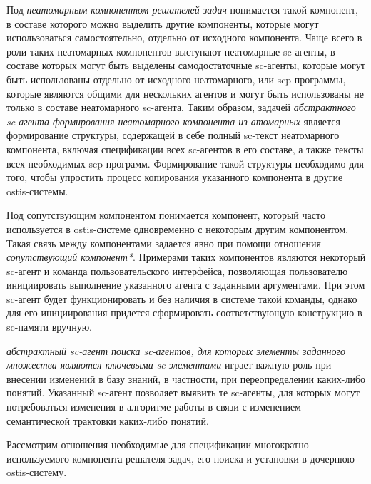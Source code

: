 Под \textit{неатомарным компонентом решателей задач} понимается такой компонент, в составе которого можно выделить другие компоненты, которые могут использоваться самостоятельно, отдельно от исходного компонента. Чаще всего в роли таких неатомарных компонентов выступают неатомарные sc-агенты, в составе которых могут быть выделены самодостаточные sc-агенты, которые могут быть использованы отдельно от исходного неатомарного, или scp-программы, которые являются общими для нескольких агентов и могут быть использованы не только в составе неатомарного sc-агента. Таким образом, задачей \textit{абстрактного sc-агента формирования неатомарного компонента из атомарных} является формирование структуры, содержащей в себе полный sc-текст неатомарного компонента, включая спецификации всех \mbox{sc-агентов} в его составе, а также тексты всех необходимых scp-программ. Формирование такой структуры необходимо для того, чтобы упростить процесс копирования указанного компонента в другие ostis-системы.

Под сопутствующим компонентом понимается компонент, который часто используется в ostis-системе одновременно с некоторым другим компонентом. Такая связь между компонентами задается явно при помощи отношения \textit{сопутствующий компонент*}. Примерами таких компонентов являются некоторый sc-агент и команда пользовательского интерфейса, позволяющая пользователю инициировать выполнение указанного агента с заданными аргументами. При этом sc-агент будет функционировать и без наличия в системе такой команды, однако для его инициирования придется сформировать соответствующую конструкцию в sc-памяти вручную.

\textit{абстрактный sc-агент поиска sc-агентов, для которых элементы заданного множества являются ключевыми sc-элементами} играет важную роль при внесении изменений в базу знаний, в частности, при переопределении каких-либо понятий. Указанный sc-агент позволяет выявить те sc-агенты, для которых могут потребоваться изменения в алгоритме работы в связи с изменением семантической трактовки каких-либо понятий.

Рассмотрим отношения необходимые для спецификации многократно используемого компонента решателя задач, его поиска и установки в дочернюю ostis-систему.

